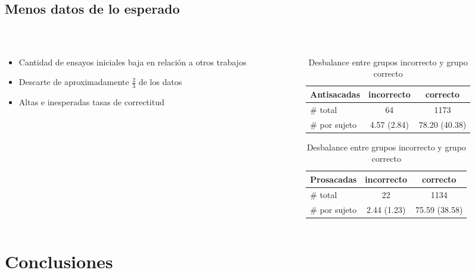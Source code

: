 \documentclass[aspectratio=169]{beamer}
\begin{document}
\subsection{Menos datos de lo esperado}

\begin{frame}{~}
  \begin{columns}
    \begin{column}{0.4\textwidth}
      \begin{itemize}
        \item Cantidad de ensayos iniciales baja en relación a otros trabajos
        \item Descarte de aproximadamente $\frac{2}{3}$ de los datos
        \item Altas e inesperadas tasas de correctitud
      \end{itemize}
    \end{column}

    \begin{column}{0.6\textwidth}
      \begin{table}
        \centering

        \begin{tabular}{ l | c | c }
          Antisacadas   & incorrecto  & correcto \\
          \hline
          \# total      & 64          & 1173 \\
          \hline
          \# por sujeto & 4.57 (2.84) & 78.20 (40.38)
        \end{tabular}

        \vspace{0.3cm}

        \begin{tabular}{ l | c | c }
          Prosacadas    & incorrecto  & correcto \\
          \hline
          \# total      & 22          & 1134 \\
          \hline
          \# por sujeto & 2.44 (1.23) & 75.59 (38.58)
        \end{tabular}

        \caption{Desbalance entre grupos incorrecto y grupo correcto}
      \end{table}
    \end{column}
  \end{columns}
\end{frame}


\section{Conclusiones}
\end{document}
